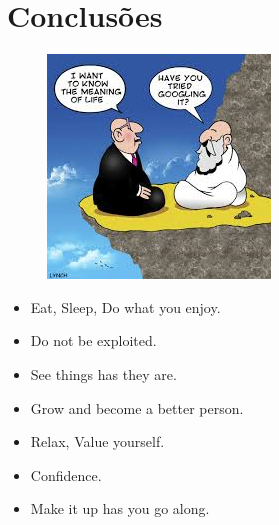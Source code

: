 \section{Conclusões}
\begin{frame}
\begin{minipage}{7cm}
	\begin{figure}[ht]
		\flushleft
		\includegraphics[scale=0.7]{./image/Objectives/Meaning_of_Life.jpeg}
	\end{figure}
\end{minipage}
\begin{minipage}{5cm}
	\begin{itemize}
		\item Eat, Sleep, Do what you enjoy.
		\item Do not be exploited.
		\item See things has they are.
		\item Grow and become a better person.
		\item Relax, Value yourself.
		\item Confidence.
		\item Make it up has you go along.
	\end{itemize}
\end{minipage}
\end{frame}
